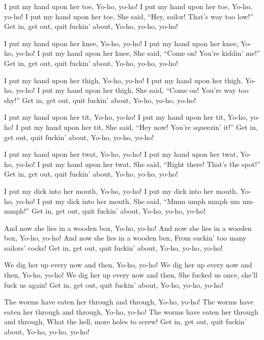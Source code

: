\beginverse
I put my hand upon her toe,
Yo-ho, yo-ho!
I put my hand upon her toe,
Yo-ho, yo-ho!
I put my hand upon her toe,
She said, ``Hey, sailor!  That's way too low!''
Get in, get out, quit fuckin' about,
Yo-ho, yo-ho, yo-ho!
\endverse

\beginverse
I put my hand upon her knee,
Yo-ho, yo-ho!
I put my hand upon her knee,
Yo-ho, yo-ho!
I put my hand upon her knee,
She said, ``Come on!  You're kiddin' me!''
Get in, get out, quit fuckin' about,
Yo-ho, yo-ho, yo-ho!
\endverse

\beginverse
I put my hand upon her thigh,
Yo-ho, yo-ho!
I put my hand upon her thigh,
Yo-ho, yo-ho!
I put my hand upon her thigh,
She said, ``Come on!  You're way too shy!''
Get in, get out, quit fuckin' about,
Yo-ho, yo-ho, yo-ho!
\endverse

\beginverse
I put my hand upon her tit,
Yo-ho, yo-ho!
I put my hand upon her tit,
Yo-ho, yo-ho!
I put my hand upon her tit,
She said, ``Hey now!  You're squeezin' it!''
Get in, get out, quit fuckin' about,
Yo-ho, yo-ho, yo-ho!
\endverse

\beginverse
I put my hand upon her twat,
Yo-ho, yo-ho!
I put my hand upon her twat,
Yo-ho, yo-ho!
I put my hand upon her twat,
She said, ``Right there!  That's the spot!''
Get in, get out, quit fuckin' about,
Yo-ho, yo-ho, yo-ho!
\endverse

\beginverse
I put my dick into her mouth,
Yo-ho, yo-ho!
I put my dick into her mouth,
Yo-ho, yo-ho!
I put my dick into her mouth,
She said, ``Mmm umph mmph um um-mmph!''
Get in, get out, quit fuckin' about,
Yo-ho, yo-ho, yo-ho!
\endverse

\beginverse
And now she lies in a wooden box,
Yo-ho, yo-ho!
And now she lies in a wooden box,
Yo-ho, yo-ho!
And now she lies in a wooden box,
From suckin' too many sailors' cocks!
Get in, get out, quit fuckin' about,
Yo-ho, yo-ho, yo-ho!
\endverse

\beginverse
We dig her up every now and then,
Yo-ho, yo-ho!
We dig her up every now and then,
Yo-ho, yo-ho!
We dig her up every now and then,
She fucked us once, she'll fuck us again!
Get in, get out, quit fuckin' about,
Yo-ho, yo-ho, yo-ho!
\endverse

\beginverse
The worms have eaten her through and through,
Yo-ho, yo-ho!
The worms have eaten her through and through,
Yo-ho, yo-ho!
The worms have eaten her through and through,
What the hell, more holes to screw!
Get in, get out, quit fuckin' about,
Yo-ho, yo-ho, yo-ho!
\endverse
\endsong
